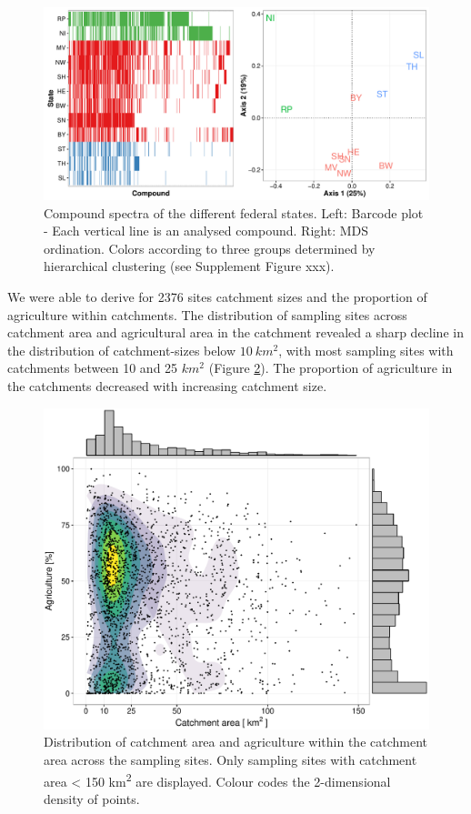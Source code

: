 \documentclass[journal=esthag,manuscript=article]{achemso}
\begin{document}
\begin{figure}[ht]
  \includegraphics[width=\textwidth]{figure2.pdf}
  \caption{Compound spectra of the different federal states. Left: Barcode plot - Each vertical line is an analysed compound. Right: MDS ordination. 
  Colors according to three groups determined by hierarchical clustering (see Supplement Figure xxx).}
  \label{fig:fig2}
\end{figure}

We were able to derive for 2376 sites catchment sizes and the proportion of agriculture within catchments. 
The distribution of sampling sites across catchment area and agricultural area in the catchment revealed a sharp decline in the distribution of catchment-sizes below $10~km^2$, with most sampling sites with catchments between 10 and 25 $km^2$ (Figure \ref{fig:fig3}).
The proportion of agriculture in the catchments decreased with increasing catchment size.

\begin{figure}[ht]
  \includegraphics[width=.8\textwidth]{figure3.pdf}
  \caption{Distribution of catchment area and agriculture within the catchment area across the sampling sites.
  Only sampling sites with catchment area < 150 km\textsuperscript{2} are displayed. 
  Colour codes the 2-dimensional density of points.
  }
  \label{fig:fig3}
\end{figure}
\end{document}
